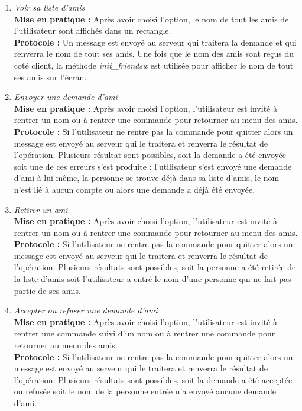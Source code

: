 \documentclass[10pt, a4paper]{article}
\begin{document}
\begin{enumerate}
\item \textit{Voir sa liste d'amis}\\
\textbf{Mise en pratique :} Après avoir choisi l'option, le nom de tout les amis de l'utilisateur sont affichés dans un rectangle.\\
\textbf{Protocole :} Un message est envoyé au serveur qui traitera la demande et qui renverra le nom de tout ses amis. Une fois que le nom des amis sont reçus du coté client, la méthode \textit{init\_friendsw} est utilisée pour afficher le nom de tout ses amis sur l'écran.

\item \textit{Envoyer une demande d'ami}\\
\textbf{Mise en pratique :} Après avoir choisi l'option, l'utilisateur est invité à rentrer un nom ou à rentrer une commande pour retourner au menu des amis.\\
\textbf{Protocole :} Si l'utilisateur ne rentre pas la commande pour quitter alors un message est envoyé au serveur qui le traitera et renverra le résultat de l'opération. Plusieurs résultat sont possibles, soit la demande a été envoyée soit une de ces erreurs s'est produite : l'utilisateur s'est envoyé une demande d'ami à lui même, la personne se trouve déjà dans sa liste d'amis, le nom n'est lié à aucun compte ou alors une demande a déjà été envoyée. 

\item \textit{Retirer un ami}\\
\textbf{Mise en pratique :} Après avoir choisi l'option, l'utilisateur est invité à rentrer un nom ou à rentrer une commande pour retourner au menu des amis.\\
\textbf{Protocole :} Si l'utilisateur ne rentre pas la commande pour quitter alors un message est envoyé au serveur qui le traitera et renverra le résultat de l'opération. Plusieurs résultats sont possibles, soit la personne a été retirée de la liste d'amis soit l'utilisateur a entré le nom d'une personne qui ne fait pas partie de ses amis.

\item \textit{Accepter ou refuser une demande d'ami}\\
\textbf{Mise en pratique :} Après avoir choisi l'option, l'utilisateur est invité à rentrer une commande suivi d'un nom ou à rentrer une commande pour retourner au menu des amis.\\
\textbf{Protocole :} Si l'utilisateur ne rentre pas la commande pour quitter alors un message est envoyé au serveur qui le traitera et renverra le résultat de l'opération. Plusieurs résultats sont possibles, soit la demande a été acceptée ou refusée soit le nom de la personne entrée n'a envoyé aucune demande d'ami.


\end{enumerate}
\end{document}
